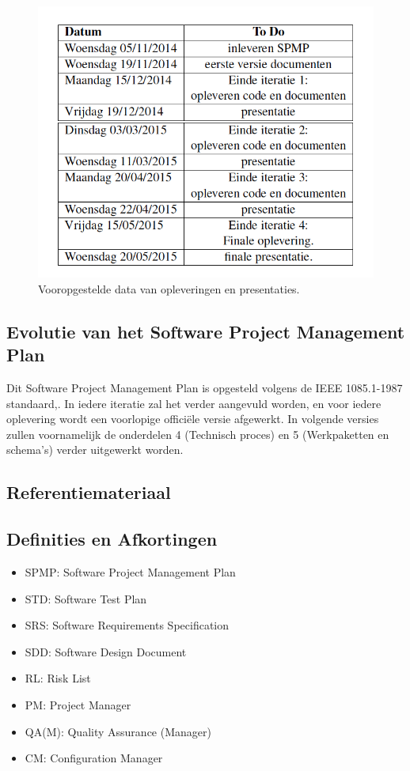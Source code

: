 \documentclass{article}
\begin{document}
\begin{figure}[h!]
\centering
 \includegraphics[width=120mm]{kalender.png}
 \caption{Vooropgestelde data van opleveringen en presentaties.}
 \label{Kalender}
\end{figure}

\subsection{Evolutie van het Software Project Management Plan}

Dit Software Project Management Plan is opgesteld volgens de IEEE 1085.1-1987 standaard,\citep{website:Cal-Poly}. In iedere iteratie zal het verder aangevuld worden, en voor iedere oplevering wordt een voorlopige  offici\"{e}le versie afgewerkt. In volgende versies zullen voornamelijk de onderdelen 4 (Technisch proces) en 5 (Werkpaketten en schema's) verder uitgewerkt worden.

\clearpage

\subsection{Referentiemateriaal}
\begingroup
\renewcommand{\section}[2]{}%

\endgroup
 
\subsection{Definities en Afkortingen}
\begin{itemize}
\item SPMP: Software Project Management Plan 
\item STD:  Software Test Plan 
\item SRS: Software Requirements Specification 
\item SDD: Software Design Document 
\item RL: Risk List
\item PM: Project Manager
\item QA(M): Quality Assurance (Manager)
\item CM: Configuration Manager
\end{itemize}
\end{document}
